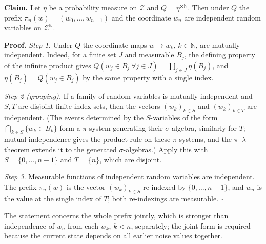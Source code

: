 \documentclass[11pt,a4paper]{article}
\begin{document}
\textbf{Claim.} Let \(\eta\) be a probability measure on \(\mathcal Z\) and \(Q=\eta^{\otimes\mathbb N}\). Then under \(Q\) the prefix \(\pi_n(w)=(w_0,\dots,w_{n-1})\) and the coordinate \(w_n\) are independent random variables on \(\mathcal Z^{\mathbb N}\).




\textbf{Proof.} \emph{Step 1.} Under \(Q\) the coordinate maps \(w\mapsto w_k\), \(k\in\mathbb N\), are mutually independent. Indeed, for a finite set \(J\) and measurable \(B_j\), the defining property of the infinite product gives \(Q(w_j\in B_j\ \forall j\in J)=\prod_{j\in J}\eta(B_j)\), and \(\eta(B_j)=Q(w_j\in B_j)\) by the same property with a single index.




\emph{Step 2 (grouping).} If a family of random variables is mutually independent and \(S,T\) are disjoint finite index sets, then the vectors \((w_k)_{k\in S}\) and \((w_k)_{k\in T}\) are independent. (The events determined by the \(S\)-variables of the form \(\bigcap_{k\in S}\{w_k\in B_k\}\) form a \(\pi\)-system generating their \(\sigma\)-algebra, similarly for \(T\); mutual independence gives the product rule on these \(\pi\)-systems, and the \(\pi\)–\(\lambda\) theorem extends it to the generated \(\sigma\)-algebras.) Apply this with \(S=\{0,\dots,n-1\}\) and \(T=\{n\}\), which are disjoint.




\emph{Step 3.} Measurable functions of independent random variables are independent. The prefix \(\pi_n(w)\) is the vector \((w_k)_{k\in S}\) re-indexed by \(\{0,\dots,n-1\}\), and \(w_n\) is the value at the single index of \(T\); both re-indexings are measurable. \(\square\)




The statement concerns the whole prefix jointly, which is stronger than independence of \(w_n\) from each \(w_k\), \(k<n\), separately; the joint form is required because the current state depends on all earlier noise values together.
\end{document}
